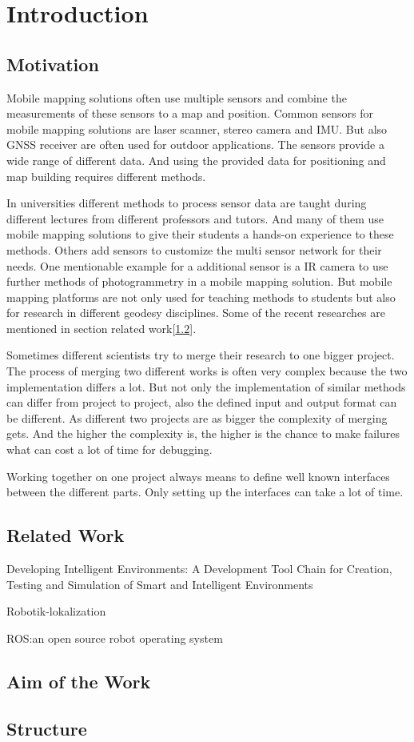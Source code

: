 \chapter{Introduction}\label{ch:introduction}

\section{Motivation}\label{sec:motivation}

Mobile mapping solutions often use multiple sensors and combine the measurements of these sensors to a map and position.
Common sensors for mobile mapping solutions are laser scanner, stereo camera and \ac{IMU}.
But also \ac{GNSS} receiver are often used for outdoor applications.
The sensors provide a wide range of different data.
And using the provided data for positioning and map building requires different methods.

In universities different methods to process sensor data are taught during different lectures from different professors and tutors.
And many of them use mobile mapping solutions to give their students a hands-on experience to these methods.
Others add sensors to customize the multi sensor network for their needs.
One mentionable example for a additional sensor is a \ac{IR} camera to use further methods of photogrammetry in a mobile mapping solution.
But mobile mapping platforms are not only used for teaching methods to students but also for research in different geodesy disciplines.
Some of the recent researches are mentioned in section related work[\ref{sec:related-work}].

Sometimes different scientists try to merge their research to one bigger project.
The process of merging two different works is often very complex because the two implementation differs a lot.
But not only the implementation of similar methods can differ from project to project, also the defined input and output format can be different.
As different two projects are as bigger the complexity of merging gets.
And the higher the complexity is, the higher is the chance to make failures what can cost a lot of time for debugging.

Working together on one project always means to define well known interfaces between the different parts.
Only setting up the interfaces can take a lot of time.

\section{Related Work}\label{sec:related-work}
Developing Intelligent Environments: A Development Tool Chain for Creation, Testing and Simulation of Smart and Intelligent Environments\cite{roalter2011developing}

Robotik-lokalization\cite{MooreStouchKeneralizedEkf2014}

ROS:\@ an open source robot operating system\cite{Quigley2009ROSAO}

\section{Aim of the Work}\label{sec:aimOfTheWork}
\section{Structure}\label{sec:structure}

